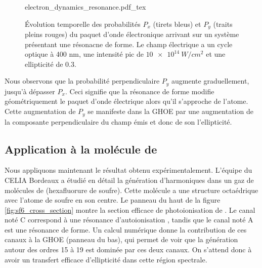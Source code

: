 \begin{figure}[!ht]
\centering
\def\svgwidth{1\columnwidth}
{electron_dynamics_resonance.pdf_tex}
\caption{\'{E}volution temporelle des probabilités $P_x$ (tirets bleus) et $P_y$ (traits pleins rouges) du paquet d'onde électronique arrivant sur un système présentant une résonacne de forme. Le champ électrique a un cycle optique à 400 nm, une intensité pic de $\SI{10e14}{W/cm^2}$ et une ellipticité de 0.3.}
\label{fig:resonant_proba}
\end{figure}

Nous observons que la probabilité perpendiculaire $P_y$ augmente graduellement, jusqu'à dépasser $P_x$. Ceci signifie que la résonance de forme modifie géométriquement le paquet d'onde électrique alors qu'il s'approche de l'atome. Cette augmentation de $P_y$ se manifeste dans la GHOE par une augmentation de la composante perpendiculaire du champ émis et donc de son l'ellipticité.

\subsection{Application à la molécule de }
Nous appliquons maintenant le résultat obtenu expérimentalement. L'équipe du CELIA Bordeaux a étudié en détail la génération d'harmoniques dans un gaz de molécules de  (hexafluorure de soufre). Cette molécule a une structure octaédrique avec l'atome de soufre en son centre. Le panneau du haut de la figure \ref{fig:sf6_cross_section} montre la section efficace de photoionisation de . Le canal noté C correspond à une résonance d'autoionisation , tandis que le canal noté A est une résonance de forme. Un calcul numérique donne la contribution de ces canaux à la GHOE (panneau du bas), qui permet de voir que la génération autour des ordres 15 à 19 est dominée par ces deux canaux. On s'attend donc à avoir un transfert efficace d'ellipticité dans cette région spectrale.

